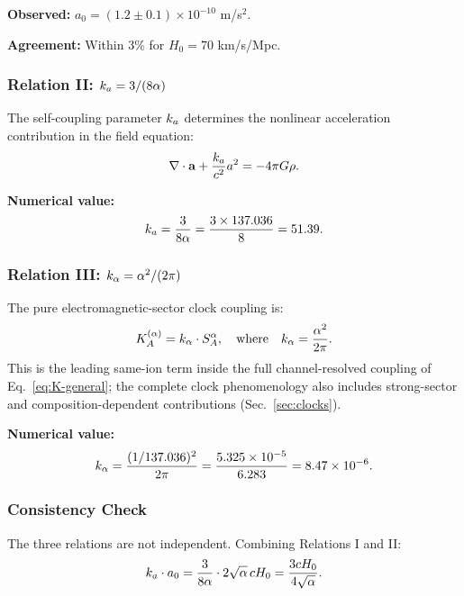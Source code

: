 \textbf{Observed:} $a_0 = (1.2 \pm 0.1) \times 10^{-10}$ m/s$^2$.

\textbf{Agreement:} Within 3\% for $H_0 = 70$ km/s/Mpc.

\subsubsection{Relation II: $k_a = 3/(8\alpha)$}

The self-coupling parameter $k_a$ determines the nonlinear acceleration 
contribution in the field equation:
\begin{equation}
\nabla\cdot\mathbf{a} + \frac{k_a}{c^2}a^2 = -4\pi G\rho.
\end{equation}

\textbf{Numerical value:}
\begin{equation}
k_a = \frac{3}{8\alpha} = \frac{3 \times 137.036}{8} = 51.39.
\end{equation}

\subsubsection{Relation III: $k_\alpha = \alpha^2/(2\pi)$}

The pure electromagnetic-sector clock coupling is:
\begin{equation}
K_A^{(\alpha)} = k_\alpha \cdot S_A^\alpha, \quad \text{where}\quad k_\alpha = \frac{\alpha^2}{2\pi}.
\end{equation}
This is the leading same-ion term inside the full channel-resolved coupling of Eq.~\eqref{eq:K-general}; the complete clock phenomenology also includes strong-sector and composition-dependent contributions (Sec.~\ref{sec:clocks}).

\textbf{Numerical value:}
\begin{equation}
k_\alpha = \frac{(1/137.036)^2}{2\pi} = \frac{5.325 \times 10^{-5}}{6.283} = 8.47 \times 10^{-6}.
\end{equation}

\subsubsection{Consistency Check}

The three relations are not independent. Combining Relations I and II:
\begin{equation}
k_a \cdot a_0 = \frac{3}{8\alpha} \cdot 2\sqrt{\alpha}\,cH_0 = \frac{3cH_0}{4\sqrt{\alpha}}.
\end{equation}

